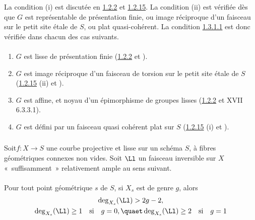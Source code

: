 La condition (i) est discutée en \hyperref[XVIII.thm1.2.2]{1.2.2} et
\hyperref[XVIII.var1.2.15]{1.2.15}. La condition (ii)
est vérifiée dès que $G$ est représentable de présentation finie, ou
image réciproque d'un faisceau sur le petit site étale de $S$, ou plat
quasi-cohérent. La condition \hyperref[XVIII.par1.3.1.1]{1.3.1.1} est donc vérifiée
dans chacun des cas suivants.

\paragraph{}
\begin{enumerate}
\renewcommand{\theenumi}{\alph{enumi}}
\renewcommand{\labelenumi}{(\theenumi)}
\item $G$ est lisse de présentation finie (\hyperref[XVIII.thm1.2.2]{1.2.2} et
  ). 

\item $G$ est image réciproque d'un faisceau de torsion sur le petit
site étale de $S$ (\hyperref[XVIII.var1.2.15]{1.2.15} (ii) et ).

\item $G$ est affine, et noyau d'un épimorphisme de groupes lisses
(\hyperref[XVIII.thm1.2.2]{1.2.2} et XVII 6.3.3.1).

\item $G$ est défini par un faisceau quasi cohérent plat sur $S$
(\hyperref[XVIII.var1.2.15]{1.2.15} (i) et ).
\end{enumerate}

\subsubsection{}
Soit\pageoriginale $f:X\rightarrow S$ une courbe projective et lisse
sur un schéma 
$S$, à fibres géométriques connexes non vides. Soit $\Ll$
un faisceau inversible sur $X$ « suffisamment » relativement
ample au sens suivant.

\paragraph{}
Pour tout point géométrique $s$ de $S$, si $X_{s}$ est de genre $g$,
alors
\begin{gather*}
\deg_{X_{s}}(\Ll)>2g-2,\\
\deg_{X_{s}}(\Ll)\geq 1\quad\mbox{\rm si}\quad g=0,\quaet
\deg_{X_{s}}(\Ll)\geq 2\quad\mbox{\rm si}\quad g=1
\end{gather*}

